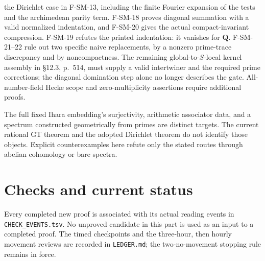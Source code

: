 \begin{description}[style=nextline,leftmargin=0pt]
the Dirichlet case in F-SM-13, including the finite Fourier expansion
of the tests and the archimedean parity term. F-SM-18 proves diagonal summation with a valid normalized indentation,
and F-SM-20 gives the actual compact-invariant compression. F-SM-19
refutes the printed indentation: it vanishes for $\mathbf Q$.
F-SM-21--22 rule out two specific naive replacements, by a nonzero
prime-trace discrepancy and by noncompactness. The remaining
global-to-$S$-local kernel assembly in \S12.3, p.~514, must supply
a valid intertwiner and the required prime corrections; the
diagonal domination step alone no longer describes the gate. All-number-field Hecke scope and
zero-multiplicity assertions require additional proofs.
\item[Profinite GT, anabelian reconstruction and geometric spectra.]
The full fixed Ihara embedding's surjectivity, arithmetic associator
data, and a spectrum constructed geometrically from primes are distinct
targets. The current rational GT theorem and the adopted Dirichlet
theorem do not identify those objects. Explicit counterexamples here
refute only the stated routes through abelian cohomology or bare spectra.
\end{description}

\section{Checks and current status}
Every completed new proof is associated with its actual reading events
in \texttt{CHECK\_EVENTS.tsv}. No unproved candidate in this part is
used as an input to a completed proof. The timed checkpoints and the
three-hour, then hourly movement reviews are recorded in
\texttt{LEDGER.md}; the two-no-movement stopping rule remains in force.

